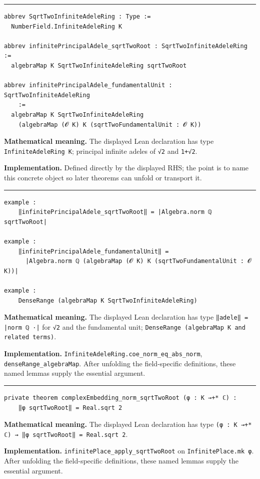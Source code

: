 \documentclass[UTF8,a4paper,11pt,fontset=fandol]{ctexart}
\theoremstyle{definition}
\newcommand{\statementsep}{\par\medskip\hrule\medskip}
\begin{document}
\statementsep
\begin{verbatim}
abbrev SqrtTwoInfiniteAdeleRing : Type :=
  NumberField.InfiniteAdeleRing K

abbrev infinitePrincipalAdele_sqrtTwoRoot : SqrtTwoInfiniteAdeleRing :=
  algebraMap K SqrtTwoInfiniteAdeleRing sqrtTwoRoot

abbrev infinitePrincipalAdele_fundamentalUnit : SqrtTwoInfiniteAdeleRing
    :=
  algebraMap K SqrtTwoInfiniteAdeleRing
    (algebraMap (𝓞 K) K (sqrtTwoFundamentalUnit : 𝓞 K))
\end{verbatim}
\noindent\textbf{Mathematical meaning.} The displayed Lean declaration has type \texttt{InfiniteAdeleRing K}; principal infinite adeles of \texttt{√2} and \texttt{1+√2}.\par
\noindent\textbf{Implementation.} Defined directly by the displayed RHS; the point is to name this concrete object so later theorems can unfold or transport it.\par
\statementsep
\begin{verbatim}
example :
    ‖infinitePrincipalAdele_sqrtTwoRoot‖ = |Algebra.norm ℚ sqrtTwoRoot|

example :
    ‖infinitePrincipalAdele_fundamentalUnit‖ =
      |Algebra.norm ℚ (algebraMap (𝓞 K) K (sqrtTwoFundamentalUnit : 𝓞 K))|

example :
    DenseRange (algebraMap K SqrtTwoInfiniteAdeleRing)
\end{verbatim}
\noindent\textbf{Mathematical meaning.} The displayed Lean declaration has type \texttt{‖adele‖ = |norm ℚ ·|} for \texttt{√2} and the fundamental unit; \texttt{DenseRange (algebraMap K and related terms)}.\par
\noindent\textbf{Implementation.} \texttt{InfiniteAdeleRing.\allowbreak{}coe\_\allowbreak{}norm\_\allowbreak{}eq\_\allowbreak{}abs\_\allowbreak{}norm}, \texttt{denseRange\_\allowbreak{}algebraMap}. After unfolding the field-specific definitions, these named lemmas supply the essential argument.\par
\statementsep
\begin{verbatim}
private theorem complexEmbedding_norm_sqrtTwoRoot (φ : K →+* ℂ) :
    ‖φ sqrtTwoRoot‖ = Real.sqrt 2
\end{verbatim}
\noindent\textbf{Mathematical meaning.} The displayed Lean declaration has type \texttt{(φ : K →+* ℂ) → ‖φ sqrtTwoRoot‖ = Real.\allowbreak{}sqrt 2}.\par
\noindent\textbf{Implementation.} \texttt{infinitePlace\_\allowbreak{}apply\_\allowbreak{}sqrtTwoRoot} on \texttt{InfinitePlace.\allowbreak{}mk φ}. After unfolding the field-specific definitions, these named lemmas supply the essential argument.\par
\end{document}
